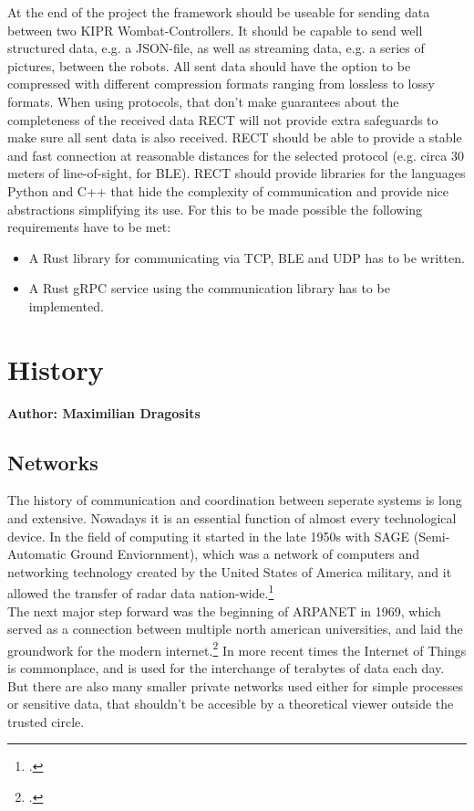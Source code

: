 At the end of the project the framework should be useable for sending data between two KIPR Wombat-Controllers. It should be capable
to send well structured data, e.g. a JSON-file, as well as streaming data, e.g. a series of pictures, between the robots. All sent data should have the
option to be compressed with different compression formats ranging from lossless to lossy formats. When using protocols, that don't make guarantees about
the completeness of the received data RECT will not provide extra safeguards to make sure all sent data is also received.
RECT should be able to provide a stable and fast connection at reasonable distances for the selected protocol (e.g. circa 30 meters of line-of-sight, for BLE).
RECT should provide libraries for the languages Python and C++ that hide the complexity of communication and provide nice abstractions simplifying its use.
For this to be made possible the following requirements have to be met:
\begin{itemize}
\item A Rust library for communicating via TCP, BLE and UDP has to be written.
\item A Rust gRPC service using the communication library has to be implemented.
\end{itemize}

\section{History}
\textbf{Author: Maximilian Dragosits}
\subsection{Networks}
The history of communication and coordination between seperate systems is long and extensive. Nowadays it is an essential 
function of almost every technological device. In the field of computing it started in the late 1950s with SAGE (Semi-Automatic Ground Enviornment),
which was a network of computers and networking technology created by the United States of America military, 
and it allowed the transfer of radar data nation-wide.\footcite[][89]{A_New_History_of_Modern_Computing}\\
The next major step forward was the beginning of ARPANET in 1969, which served as a connection between multiple north american 
universities, and laid the groundwork for the modern internet.\footcite[][25]{How_the_web_was_born}
In more recent times the Internet of Things is commonplace, and is used for the interchange of terabytes of data each day. 
But there are also many smaller private networks used either for simple processes or sensitive data, that shouldn't be 
accesible by a theoretical viewer outside the trusted circle. 

